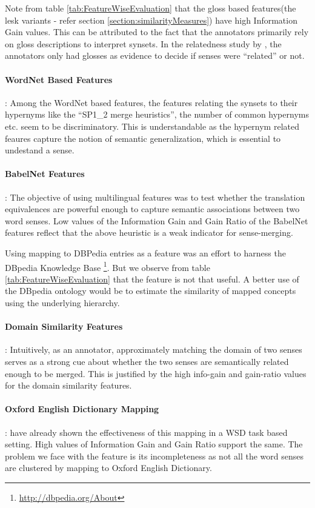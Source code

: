 Note from table \ref{tab:FeatureWiseEvaluation} that the gloss based features(the lesk variants - refer section \ref{section:similarityMeasures}) have high Information Gain values. This can be attributed to the fact that the annotators primarily rely on gloss descriptions to interpret synsets. In the relatedness study by \citep{mccarthy2006relating}, the annotators only had glosses as evidence to decide if senses were ``related'' or not.

\paragraph{WordNet Based Features}:
Among the WordNet based features, the features relating the synsets to their hypernyms like the ``SP1\_2 merge heuristics'', the number of common hypernyms etc. seem to be discriminatory. This is understandable as the hypernym related feaures capture the notion of semantic generalization, which is essential to undestand a sense. 

\paragraph{BabelNet Features}:
The objective of using multilingual features was to test whether the translation equivalences are powerful enough to capture semantic associations between two word senses. Low values of the Information Gain and Gain Ratio of the BabelNet features reflect that the above heuristic is a weak indicator for sense-merging. 

Using mapping to DBPedia entries as a feature was an effort to harness the DBpedia Knowledge Base \footnote{\url{http://dbpedia.org/About}}. But we observe from table \ref{tab:FeatureWiseEvaluation} that the feature is not that useful. A better use of the DBpedia ontology would be to estimate the similarity of mapped concepts using the underlying hierarchy.

\paragraph{Domain Similarity Features}:
Intuitively, as an annotator, approximately matching the domain of two senses serves as a strong cue about whether the two senses are semantically related enough to be merged. This is justified by the high info-gain and gain-ratio values for the domain similarity features.

\paragraph{Oxford English Dictionary Mapping}:
\citep{Navigli06meaningfulclustering} have already shown the effectiveness of this mapping in a WSD task based setting. High values of Information Gain and Gain Ratio support the same. The problem we face with the feature is its incompleteness as not all the word senses are clustered by mapping to Oxford English Dictionary.

